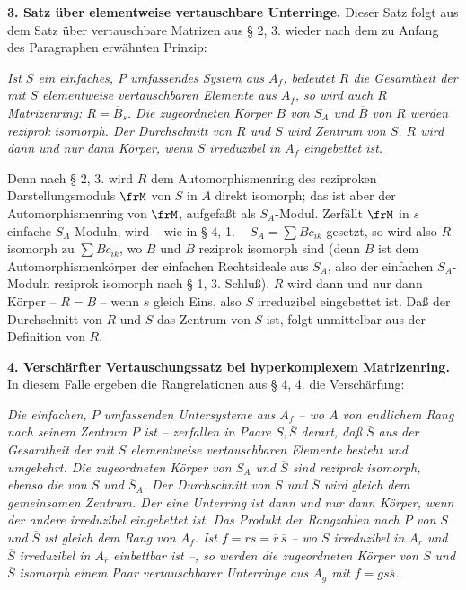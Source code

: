 \noindent\textbf{3. Satz über elementweise vertauschbare Unterringe.}
Dieser Satz folgt aus dem Satz über vertauschbare Matrizen aus § 2, 3. wieder nach dem zu Anfang des Paragraphen erwähnten Prinzip:

\emph{Ist \(S\) ein einfaches, \(P\) umfassendes System aus \(A_f\), bedeutet \(R\) die Gesamtheit der mit \(S\) elementweise vertauschbaren Elemente aus \(A_f\), so wird auch \(R\) Matrizenring: \(R=\overline B_s\). Die zugeordneten Körper \(B\) von \(S_A\) und \(\overline B\) von \(R\) werden reziprok isomorph. Der Durchschnitt von \(R\) und \(S\) wird Zentrum von \(S\). \(R\) wird dann und nur dann Körper, wenn \(S\) irreduzibel in \(A_f\) eingebettet ist.}

Denn nach § 2, 3. wird \(R\) dem Automorphismenring des reziproken Darstellungsmoduls \(\frM\) von \(S\) in \(A\) direkt isomorph; das ist aber der Automorphismenring von \(\frM\), aufgefaßt als \(S_A\)-Modul. Zerfällt \(\frM\) in \(s\) einfache \(S_A\)-Moduln, wird -- wie in § 4, 1. -- \(S_A=\sum Bc_{ik}\) gesetzt, so wird also \(R\) isomorph zu \(\sum \overline Bc_{ik}\), wo \(B\) und \(\overline B\) reziprok isomorph sind (denn \(B\) ist dem Automorphismenkörper der einfachen Rechtsideale aus \(S_A\), also der einfachen \(S_A\)-Moduln reziprok isomorph nach § 1, 3. Schluß). \(R\) wird dann und nur dann Körper -- \(R=\overline B\) -- wenn \(s\) gleich Eins, also \(S\) irreduzibel eingebettet ist. Daß der Durchschnitt von \(R\) und \(S\) das Zentrum von \(S\) ist, folgt unmittelbar aus der Definition von \(R\).

\noindent\textbf{4. Verschärfter Vertauschungssatz bei hyperkomplexem Matrizenring.} In diesem Falle ergeben die Rangrelationen aus § 4, 4. die Verschärfung:

\emph{Die einfachen, \(P\) umfassenden Untersysteme aus \(A_f\) -- wo \(A\) von endlichem Rang nach seinem Zentrum \(P\) ist -- zerfallen in Paare \(S,\overline S\) derart, daß \(\overline S\) aus der Gesamtheit der mit \(S\) elementweise vertauschbaren Elemente besteht und umgekehrt. Die zugeordneten Körper von \(S_A\) und \(\overline S\) sind reziprok isomorph, ebenso die von \(S\) und \(\overline S_A\). Der Durchschnitt von \(S\) und \(\overline S\) wird gleich dem gemeinsamen Zentrum. Der eine Unterring ist dann und nur dann Körper, wenn der andere irreduzibel eingebettet ist. Das Produkt der Rangzahlen nach \(P\) von \(S\) und \(\overline S\) ist gleich dem Rang von \(A_f\). Ist \(f=rs=\overline r\,\overline s\) -- wo \(S\) irreduzibel in \(A_r\) und \(\overline S\) irreduzibel in \(A_{\overline r}\) einbettbar ist --, so werden die zugeordneten Körper von \(S\) und \(\overline S\) isomorph einem Paar vertauschbarer Unterringe aus \(A_g\) mit \(f=g s\overline s\).}

